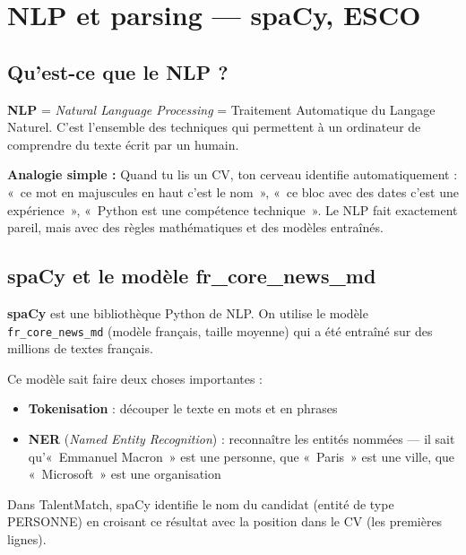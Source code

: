 \documentclass[12pt,a4paper]{article}
\newenvironment{simplification}{%
  \def\FrameCommand{\fboxsep=8pt\colorbox{green!10}}%
  \MakeFramed{\advance\hsize-\width \FrameRestore}%
  \vspace{-4pt}%
}{\endMakeFramed}
\newcommand{\concept}[1]{\textbf{\color{bleu}#1}}
\newcommand{\tech}[1]{\texttt{#1}}
\begin{document}
\newpage

\section{NLP et parsing — spaCy, ESCO}

\subsection{Qu'est-ce que le NLP ?}

\concept{NLP} = \textit{Natural Language Processing} = Traitement Automatique du Langage Naturel. C'est l'ensemble des techniques qui permettent à un ordinateur de comprendre du texte écrit par un humain.

\begin{simplification}
\textbf{Analogie simple :}
Quand tu lis un CV, ton cerveau identifie automatiquement : «~ce mot en majuscules en haut c'est le nom~», «~ce bloc avec des dates c'est une expérience~», «~Python est une compétence technique~». Le NLP fait exactement pareil, mais avec des règles mathématiques et des modèles entraînés.
\end{simplification}

\subsection{spaCy et le modèle fr\_core\_news\_md}

\concept{spaCy} est une bibliothèque Python de NLP. On utilise le modèle \tech{fr\_core\_news\_md} (modèle français, taille moyenne) qui a été entraîné sur des millions de textes français.

Ce modèle sait faire deux choses importantes :
\begin{itemize}
  \item \textbf{Tokenisation} : découper le texte en mots et en phrases
  \item \textbf{NER} (\textit{Named Entity Recognition}) : reconnaître les entités nommées — il sait qu'«~Emmanuel Macron~» est une personne, que «~Paris~» est une ville, que «~Microsoft~» est une organisation
\end{itemize}

Dans TalentMatch, spaCy identifie le nom du candidat (entité de type PERSONNE) en croisant ce résultat avec la position dans le CV (les premières lignes).
\end{document}
